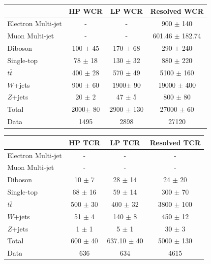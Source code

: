 \begin{table}
\begin{tabular}{|l|c|c|c|}
\hline
	  &	 HP WCR &	 LP WCR &	Resolved WCR \\\hline 
	Electron Multi-jet &	- &	- &	900 $\pm$ 140 \\\hline 
	Muon Multi-jet &	- &	- &	601.46 $\pm$ 182.74 \\\hline 
	Diboson &	100 $\pm$ 45 &	170 $\pm$ 68 &	290 $\pm$ 240 \\\hline 
	Single-top &	78 $\pm$ 18 &	130 $\pm$ 32 &	880 $\pm$ 220 \\\hline 
	$t\bar{t}$ &	400 $\pm$ 28 &	570 $\pm$ 49 &	5100 $\pm$ 160 \\\hline 
	$W$+jets &	900 $\pm$ 60 &	1900$\pm$ 90 &	19000 $\pm$ 400 \\\hline 
	$Z$+jets &	20 $\pm$ 2 &	47 $\pm$ 5 &	800 $\pm$ 80 \\\hline 
	Total &	2000$\pm$ 80 &	2900 $\pm$ 130 &	27000 $\pm$ 60 \\\hline 
	Data &	1495 &	2898 &	27120 \\\hline 
\end{tabular}

\begin{tabular}{|l|c|c|c|}
\hline
	  &	 HP TCR &	 LP TCR &	Resolved TCR \\\hline 
	Electron Multi-jet &	- &	- &	- \\\hline 
	Muon Multi-jet &	- &	- &	- \\\hline 
	Diboson &	10 $\pm$ 7 &	28 $\pm$ 14 &	24 $\pm$ 20\\\hline 
	Single-top &	68 $\pm$ 16 &	59 $\pm$ 14 &	300 $\pm$ 70 \\\hline 
	$t\bar{t}$ &	500 $\pm$ 30 &	400 $\pm$ 32 &	3800 $\pm$ 100 \\\hline 
	$W$+jets &	51 $\pm$ 4 &	140 $\pm$ 8&	450 $\pm$ 12 \\\hline 
	$Z$+jets &	1 $\pm$ 1 &	5 $\pm$ 1 &	30 $\pm$ 3 \\\hline 
	Total &	600 $\pm$ 40&	637.10 $\pm$ 40 &	5000 $\pm$ 130 \\\hline 
	Data &	636 &	634 &	4615 \\\hline 
\end{tabular}


\end{table}
